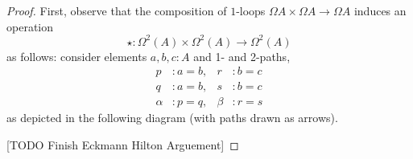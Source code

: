 \begin{proof}
First, observe that the composition of $1$-loops $\Omega A\times \Omega A\to \Omega A$ induces an operation
\[
\star : \Omega^2(A)\times \Omega^2(A)\to \Omega^2(A)
\]
as follows: consider elements $a, b, c : A$ and 1- and 2-paths,
%
\begin{align*}
 p &: a = b,       &       r &: b = c \\
 q &: a = b,       &       s &: b = c \\
 \alpha &: p = q,  &   \beta &: r = s
\end{align*}
%
as depicted in the following diagram (with paths drawn as arrows).

[TODO Finish Eckmann Hilton Arguement]

\end{proof}
